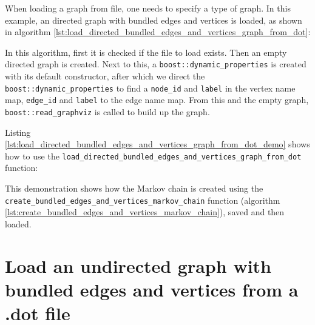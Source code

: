 When loading a graph from file, one needs to specify a type of graph.
In this example, an directed graph with bundled edges and vertices is loaded,
as shown in algorithm 
\ref{lst:load_directed_bundled_edges_and_vertices_graph_from_dot}:



In this algorithm, first it is checked if the file to load exists.
Then an empty directed graph is created.
Next to this, a 
\verb;boost::dynamic_properties; 
is created with its default constructor, after which we direct the 
\verb;boost::dynamic_properties; 
to find a \verb;node_id; and \verb;label; in the vertex name map, 
\verb;edge_id; and \verb;label; to the edge name map.
 From this and the empty graph, 
\verb;boost::read_graphviz; 
is called to build up the graph.

Listing 
\ref{lst:load_directed_bundled_edges_and_vertices_graph_from_dot_demo}
shows how to use the \verb;load_directed_bundled_edges_and_vertices_graph_from_dot;
function:



This demonstration shows how the Markov chain is created using 
the \verb;create_bundled_edges_and_vertices_markov_chain; function 
(algorithm \ref{lst:create_bundled_edges_and_vertices_markov_chain}), 
saved and then loaded.

\section{Load an undirected graph with bundled edges and vertices from a .dot file}
\label{subsec:load_undirected_bundled_edges_and_vertices_graph_from_dot}

